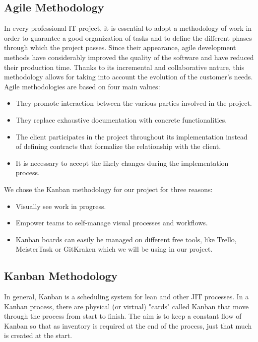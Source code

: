 \begin{spacing}{1.2}
\subsection{Agile Methodology}
In every professional IT project, it is essential to adopt a methodology
of work in order to guarantee a good organization of tasks and to define the different phases
through which the project passes.
Since their appearance, agile \cite{agile}  development methods have considerably improved
the quality of the software and have reduced their production time. Thanks to its incremental and collaborative nature, this methodology allows for taking into account the evolution
of the customer's needs. Agile methodologies are based on four main values:
\begin{itemize}
	\item They promote interaction between the various parties involved in the project.
\item They replace exhaustive documentation with concrete functionalities.
\item The client participates in the project throughout its implementation instead of defining contracts
that formalize the relationship with the client.
\item It is necessary to accept the likely changes during the implementation process.
\end{itemize}

We chose the Kanban methodology for our project for three reasons:

\begin{itemize}
	\item Visually see work in progress.
	\item Empower teams to self-manage visual processes and workflows.
	\item Kanban boards can easily be managed on different free tools, like Trello, MeisterTask or GitKraken which we will be using in our project.
\end{itemize}



\subsection{Kanban Methodology}

In general, Kanban\cite{kanban} is a scheduling system for lean and other JIT processes. In a Kanban process, there are physical (or virtual) "cards" called Kanban that move through the process from start to finish. The aim is to keep a constant flow of Kanban so that as inventory is required at the end of the process, just that much is created at the start.
\newline


\end{spacing}
